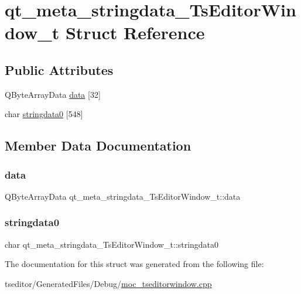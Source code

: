 \hypertarget{structqt__meta__stringdata___ts_editor_window__t}{}\section{qt\+\_\+meta\+\_\+stringdata\+\_\+\+Ts\+Editor\+Window\+\_\+t Struct Reference}
\label{structqt__meta__stringdata___ts_editor_window__t}
\subsection*{Public Attributes}
\begin{DoxyCompactItemize}
\item 
Q\+Byte\+Array\+Data \mbox{\hyperlink{structqt__meta__stringdata___ts_editor_window__t_a4bc642e72a9bdc98851fad574f8a32a4}{data}} \mbox{[}32\mbox{]}
\item 
char \mbox{\hyperlink{structqt__meta__stringdata___ts_editor_window__t_a53f61d50d00e29496f22a5a295c94bc5}{stringdata0}} \mbox{[}548\mbox{]}
\end{DoxyCompactItemize}


\subsection{Member Data Documentation}
\mbox{\label{structqt__meta__stringdata___ts_editor_window__t_a4bc642e72a9bdc98851fad574f8a32a4}} 
\subsubsection{\texorpdfstring{data}{data}}
{\footnotesize\ttfamily Q\+Byte\+Array\+Data qt\+\_\+meta\+\_\+stringdata\+\_\+\+Ts\+Editor\+Window\+\_\+t\+::data}

\mbox{\label{structqt__meta__stringdata___ts_editor_window__t_a53f61d50d00e29496f22a5a295c94bc5}} 
\subsubsection{\texorpdfstring{stringdata0}{stringdata0}}
{\footnotesize\ttfamily char qt\+\_\+meta\+\_\+stringdata\+\_\+\+Ts\+Editor\+Window\+\_\+t\+::stringdata0}



The documentation for this struct was generated from the following file\+:\begin{DoxyCompactItemize}
\item 
tseditor/\+Generated\+Files/\+Debug/\mbox{\hyperlink{_debug_2moc__tseditorwindow_8cpp}{moc\+\_\+tseditorwindow.\+cpp}}\end{DoxyCompactItemize}
